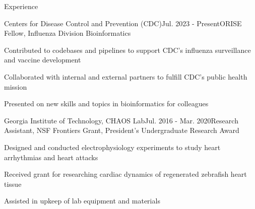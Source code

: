 \documentclass{resume} %
\begin{document}
\begin{rSection}{Experience}

  \begin{rSubsection}{Centers for Disease Control and Prevention (CDC)}{Jul. 2023 - Present}{ORISE Fellow, Influenza Division Bioinformatics}{}
  \item Contributed to codebases and pipelines to support CDC's influenza surveillance and vaccine development
  \item Collaborated with internal and external partners to fulfill CDC's public health mission
  \item Presented on new skills and topics in bioinformatics for colleagues
  \end{rSubsection}


  \begin{rSubsection}{Georgia Institute of Technology, CHAOS Lab}{Jul. 2016 - Mar. 2020}{Research Assistant, NSF Frontiers Grant, President's Undergraduate Research Award}{}
  \item Designed and conducted electrophysiology  experiments to study heart arrhythmias and heart attacks
  \item Received grant for researching cardiac dynamics of regenerated zebrafish heart tissue
  \item Assisted in upkeep of lab equipment and materials
  \end{rSubsection}



\end{rSection}
\end{document}
